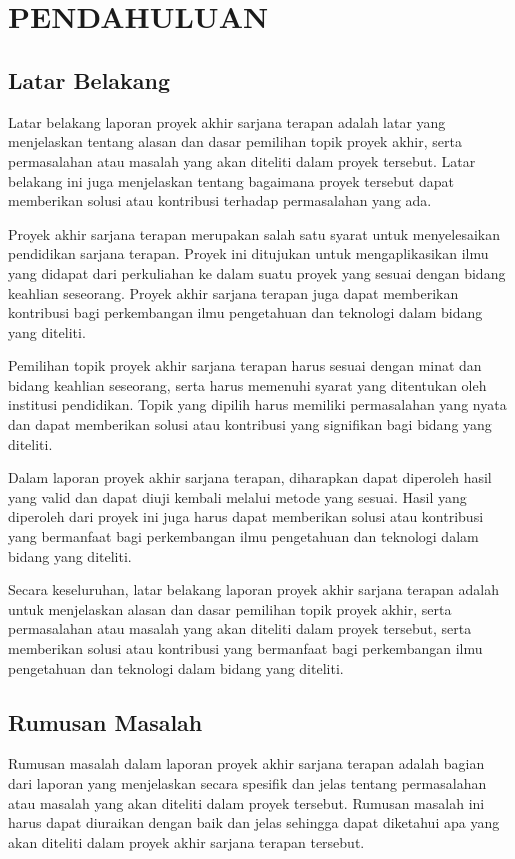 \chapter[PENDAHULUAN]{\\ PENDAHULUAN}

\section{Latar Belakang}
Latar belakang laporan proyek akhir sarjana terapan adalah latar yang menjelaskan tentang alasan dan dasar pemilihan topik proyek akhir, serta permasalahan atau masalah yang akan diteliti dalam proyek tersebut. Latar belakang ini juga menjelaskan tentang bagaimana proyek tersebut dapat memberikan solusi atau kontribusi terhadap permasalahan yang ada.

Proyek akhir sarjana terapan merupakan salah satu syarat untuk menyelesaikan pendidikan sarjana terapan. Proyek ini ditujukan untuk mengaplikasikan ilmu yang didapat dari perkuliahan ke dalam suatu proyek yang sesuai dengan bidang keahlian seseorang. Proyek akhir sarjana terapan juga dapat memberikan kontribusi bagi perkembangan ilmu pengetahuan dan teknologi dalam bidang yang diteliti.

Pemilihan topik proyek akhir sarjana terapan harus sesuai dengan minat dan bidang keahlian seseorang, serta harus memenuhi syarat yang ditentukan oleh institusi pendidikan. Topik yang dipilih harus memiliki permasalahan yang nyata dan dapat memberikan solusi atau kontribusi yang signifikan bagi bidang yang diteliti.

Dalam laporan proyek akhir sarjana terapan, diharapkan dapat diperoleh hasil yang valid dan dapat diuji kembali melalui metode yang sesuai. Hasil yang diperoleh dari proyek ini juga harus dapat memberikan solusi atau kontribusi yang bermanfaat bagi perkembangan ilmu pengetahuan dan teknologi dalam bidang yang diteliti.

Secara keseluruhan, latar belakang laporan proyek akhir sarjana terapan adalah untuk menjelaskan alasan dan dasar pemilihan topik proyek akhir, serta permasalahan atau masalah yang akan diteliti dalam proyek tersebut, serta memberikan solusi atau kontribusi yang bermanfaat bagi perkembangan ilmu pengetahuan dan teknologi dalam bidang yang diteliti.


\section{Rumusan Masalah}
Rumusan masalah dalam laporan proyek akhir sarjana terapan adalah bagian dari laporan yang menjelaskan secara spesifik dan jelas tentang permasalahan atau masalah yang akan diteliti dalam proyek tersebut. Rumusan masalah ini harus dapat diuraikan dengan baik dan jelas sehingga dapat diketahui apa yang akan diteliti dalam proyek akhir sarjana terapan tersebut.

